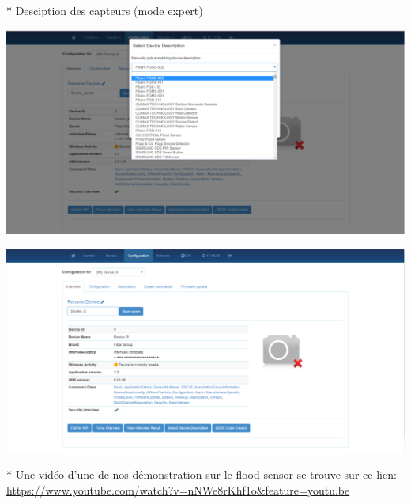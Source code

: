 * Desciption des capteurs (mode expert)

\includegraphics[scale=0.5]{./Images/png/smoke_description_zwaveme.png}\newline

\includegraphics[scale=0.5]{./Images/png/description_zwaveme.png}\newline

* Une vidéo d'une de nos démonstration sur le flood sensor se trouve sur ce lien:
 \url{https://www.youtube.com/watch?v=nNWe8rKhf1o&feature=youtu.be}


